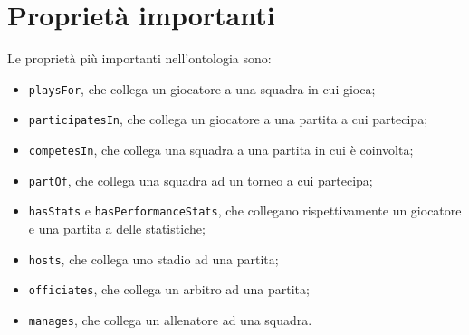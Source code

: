 \documentclass[11pt]{report} %
\begin{document}
\section{Proprietà importanti}

Le proprietà più importanti nell'ontologia sono:

\begin{itemize}
    \item \texttt{playsFor}, che collega un giocatore a una squadra in cui gioca;
    \item \texttt{participatesIn}, che collega un giocatore a una partita a cui partecipa;
    \item \texttt{competesIn}, che collega una squadra a una partita in cui è coinvolta;
    \item \texttt{partOf}, che collega una squadra ad un torneo a cui partecipa;
    \item \texttt{hasStats} e \texttt{hasPerformanceStats}, che collegano rispettivamente un giocatore e una partita a delle statistiche;
    \item \texttt{hosts}, che collega uno stadio ad una partita;
    \item \texttt{officiates}, che collega un arbitro ad una partita;
    \item \texttt{manages}, che collega un allenatore ad una squadra.
\end{itemize}
    
\end{document}
